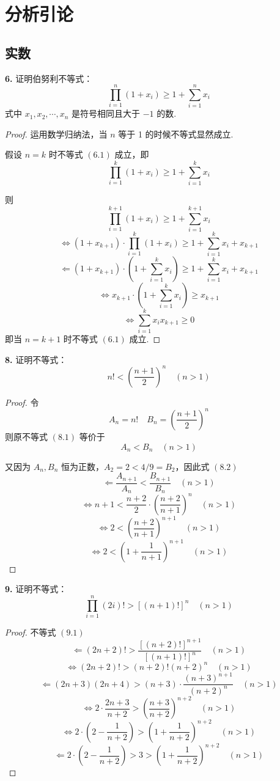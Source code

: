 \section{分析引论}
\subsection{实数}
\textbf{6.} 证明伯努利不等式：
\[\prod_{i=1}^{n} (1 + x_i) \geqslant 1 + \sum_{i=1}^{n} x_i \tag{6.1}\]
式中 $x_1, x_2, \cdots, x_n$ 是符号相同且大于 $-1$ 的数.
\begin{proof}
    运用数学归纳法，当 $n$ 等于 1 的时候不等式显然成立.

    假设 $n = k$ 时不等式 $(6.1)$ 成立，即
    \[\prod_{i=1}^{k} (1+x_i) \geqslant 1 + \sum_{i=1}^{k} x_i \tag{6.2}\]

    则
    \[\prod_{i=1}^{k+1} (1+x_i) \geqslant 1 + \sum_{i=1}^{k+1} x_i \tag{6.3}\]
    \[\Leftrightarrow (1 + x_{k+1}) \cdot \prod_{i=1}^{k}(1+x_i) \geqslant 1 + \sum_{i=1}^{k}x_i + x_{k+1}\]
    \[\Leftarrow (1 + x_{k+1}) \cdot \left(1 + \sum_{i=1}^{k}x_i\right) \geqslant 1 + \sum_{i=1}^{k}x_i + x_{k+1}\]
    \[\Leftrightarrow x_{k+1} \cdot \left(1 + \sum_{i=1}^{k}x_i\right) \geqslant x_{k+1}\]
    \[\Leftrightarrow \sum_{i=1}^{k}x_ix_{k+1} \geqslant 0 \tag{6.4}\]
    即当 $n = k+1$ 时不等式 $(6.1)$ 成立.
\end{proof}\vspace{9pt}

\textbf{8.} 证明不等式：
\[n! < \left(\frac{n+1}{2}\right)^n \quad (n > 1) \tag{8.1}\]
\begin{proof}
    令
    \[A_n = n! \quad B_n = \left(\frac{n+1}{2}\right)^n\]
    则原不等式 $(8.1)$ 等价于
    \[A_n < B_n \quad (n>1) \tag{8.2}\]

    又因为 $A_n, B_n$ 恒为正数，$A_2 = 2 < 4/9 = B_2$，因此式 $(8.2)$
    \[\Leftarrow \frac{A_{n+1}}{A_n} < \frac{B_{n+1}}{B_n} \quad (n>1) \tag{8.3}\]
    \[\Leftrightarrow n+1 < \frac{n+2}{2} \cdot \left(\frac{n+2}{n+1}\right)^n \quad (n>1)\]
    \[\Leftrightarrow 2 < \left(\frac{n+2}{n+1}\right)^{n+1} \quad (n>1)\]
    \[\Leftrightarrow 2 < \left(1 + \frac{1}{n+1}\right)^{n+1} \quad (n>1) \tag{8.4}\]
\end{proof}\vspace{9pt}

\textbf{9.} 证明不等式：
\[\prod_{i=1}^{n}(2i)! > [(n+1)!]^n \quad (n>1) \tag{9.1}\]
\begin{proof}
    不等式 $(9.1)$
    \[\Leftarrow (2n+2)! > \frac{[(n+2)!]^{n+1}}{[(n+1)!]^n} \quad (n>1) \tag{9.2}\]
    \[\Leftrightarrow (2n+2)! > (n+2)!(n+2)^n \quad (n>1)\]
    \[\Leftarrow (2n+3)(2n+4) > (n+3) \cdot \frac{(n+3)^{n+1}}{(n+2)^n} \quad (n>1) \tag{9.3}\]
    \[\Leftrightarrow 2 \cdot \frac{2n+3}{n+2} > \left(\frac{n+3}{n+2}\right)^{n+2} \quad (n>1)\]
    \[\Leftrightarrow 2 \cdot \left(2 - \frac{1}{n+2}\right) > \left(1 + \frac{1}{n+2}\right)^{n+2} \quad (n>1)\]
    \[\Leftarrow 2 \cdot \left(2 - \frac{1}{n+2}\right) > 3 > \left(1 + \frac{1}{n+2}\right)^{n+2} \quad (n>1) \tag{9.4}\]
\end{proof}\vspace{9pt}

